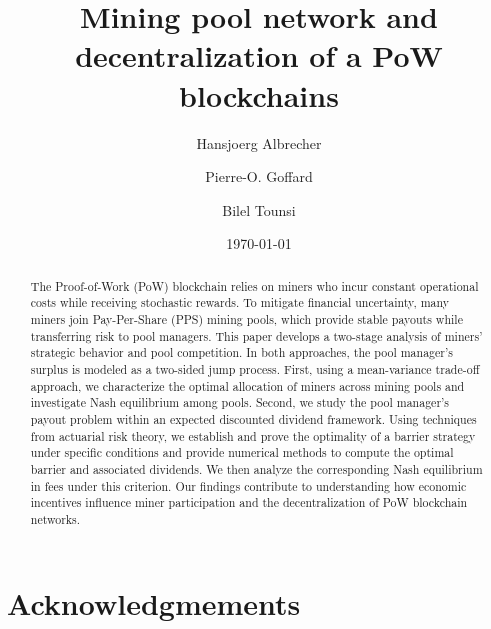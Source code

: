 \documentclass[10pt]{article}
\begin{document}
\title{Mining pool network and decentralization of a PoW blockchains}
\author[1]{Hansjoerg Albrecher}
\author[2]{Pierre-O. Goffard}
\author[3]{Bilel Tounsi}

\date{\today }

\maketitle
\vspace{3mm}

\begin{abstract}
The Proof-of-Work (PoW) blockchain relies on miners who incur constant operational costs while receiving stochastic rewards. To mitigate financial uncertainty, many miners join Pay-Per-Share (PPS) mining pools, which provide stable payouts while transferring risk to pool managers. This paper develops a two-stage analysis of miners’ strategic behavior and pool competition. In both approaches, the pool manager’s surplus is modeled as a two-sided jump process. First, using a mean-variance trade-off approach, we characterize the optimal allocation of miners across mining pools and investigate Nash equilibrium among pools. Second, we study the pool manager’s payout problem within an expected discounted dividend framework. Using techniques from actuarial risk theory, we establish and prove the optimality of a barrier strategy under specific conditions and provide numerical methods to compute the optimal barrier and associated dividends. We then analyze the corresponding Nash equilibrium in fees under this criterion. Our findings contribute to understanding how economic incentives influence miner participation and the decentralization of PoW blockchain networks.
\end{abstract}





% 




\section*{Acknowledgmements} 


\end{document}
